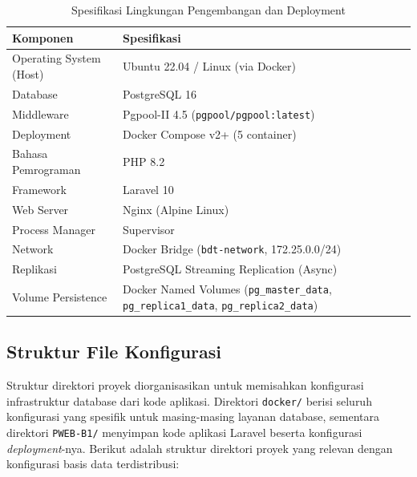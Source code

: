 \begin{table}[H]
\centering
\caption{Spesifikasi Lingkungan Pengembangan dan Deployment}
\label{tab:environment}
\begin{tabularx}{\textwidth}{l X}
\toprule
\textbf{Komponen} & \textbf{Spesifikasi} \\
\midrule
Operating System (Host)  & Ubuntu 22.04 / Linux (via Docker) \\
Database                 & PostgreSQL 16 \\
Middleware               & Pgpool-II 4.5
                           (\texttt{pgpool/pgpool:latest}) \\
Deployment               & Docker Compose v2+ (5 container) \\
Bahasa Pemrograman       & PHP 8.2 \\
Framework                & Laravel 10 \\
Web Server               & Nginx (Alpine Linux) \\
Process Manager          & Supervisor \\
Network                  & Docker Bridge
                           (\texttt{bdt-network}, 172.25.0.0/24) \\
Replikasi                & PostgreSQL Streaming Replication
                           (Async) \\
Volume Persistence       & Docker Named Volumes
                           (\texttt{pg\_master\_data},
                            \texttt{pg\_replica1\_data},
                            \texttt{pg\_replica2\_data}) \\
\bottomrule
\end{tabularx}
\end{table}

\subsection{Struktur File Konfigurasi}

Struktur direktori proyek diorganisasikan untuk memisahkan konfigurasi
infrastruktur database dari kode aplikasi. Direktori
\texttt{docker/} berisi seluruh konfigurasi yang spesifik untuk
masing-masing layanan database, sementara direktori
\texttt{PWEB-B1/} menyimpan kode aplikasi Laravel beserta konfigurasi
\textit{deployment}-nya. Berikut adalah struktur direktori proyek yang
relevan dengan konfigurasi basis data terdistribusi:

